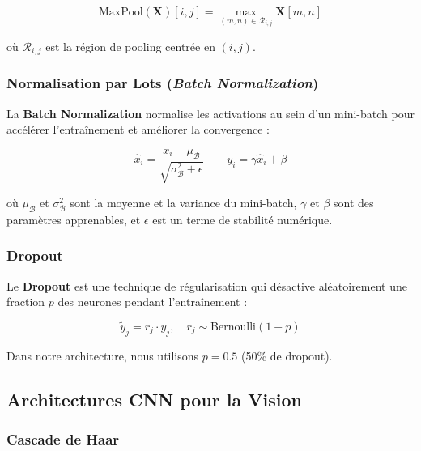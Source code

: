 \documentclass[12pt,a4paper,twoside]{report}
\newcommand{\keyword}[1]{\textbf{\textcolor{stellantisblue}{#1}}}
\begin{document}
\begin{equation}
\text{MaxPool}(\mathbf{X})[i, j] = \max_{(m, n) \in \mathcal{R}_{i,j}} \mathbf{X}[m, n]
\label{eq:maxpool}
\end{equation}

où $\mathcal{R}_{i,j}$ est la région de pooling centrée en $(i, j)$.

\subsubsection{Normalisation par Lots (\textit{Batch Normalization})}

La \keyword{Batch Normalization} \cite{ioffe2015} normalise les activations au sein d'un mini-batch pour accélérer l'entraînement et améliorer la convergence :

\begin{equation}
\hat{x}_i = \frac{x_i - \mu_{\mathcal{B}}}{\sqrt{\sigma_{\mathcal{B}}^2 + \epsilon}} \qquad y_i = \gamma \hat{x}_i + \beta
\label{eq:batchnorm}
\end{equation}

où $\mu_{\mathcal{B}}$ et $\sigma_{\mathcal{B}}^2$ sont la moyenne et la variance du mini-batch, $\gamma$ et $\beta$ sont des paramètres apprenables, et $\epsilon$ est un terme de stabilité numérique.

\subsubsection{Dropout}

Le \keyword{Dropout} \cite{srivastava2014} est une technique de régularisation qui désactive aléatoirement une fraction $p$ des neurones pendant l'entraînement :

\begin{equation}
\tilde{y}_j = r_j \cdot y_j, \quad r_j \sim \text{Bernoulli}(1 - p)
\label{eq:dropout}
\end{equation}

Dans notre architecture, nous utilisons $p = 0.5$ (50\% de dropout).

\subsection{Architectures CNN pour la Vision}

\subsubsection{Cascade de Haar}
\end{document}
